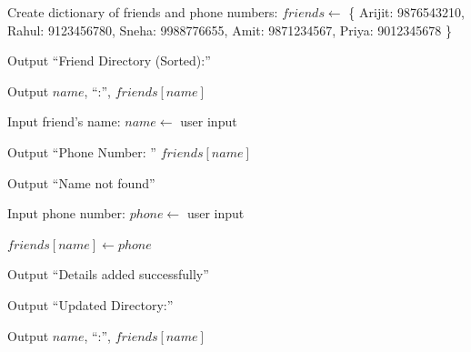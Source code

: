 \begin{algorithm}
\caption{Search and Update a Friend Directory}
\begin{algorithmic}[1]

\STATE Create dictionary of friends and phone numbers:
\STATE $friends \gets$
\{
Arijit: 9876543210,
Rahul: 9123456780,
Sneha: 9988776655,
Amit: 9871234567,
Priya: 9012345678
\}

\STATE Output ``Friend Directory (Sorted):''

    \STATE Output $name$, ``:'', $friends[name]$
\ENDFOR

\STATE Input friend's name:
\STATE $name \gets$ user input


    \STATE Output ``Phone Number: '' $friends[name]$

\ELSE

    \STATE Output ``Name not found''

    \STATE Input phone number:
    \STATE $phone \gets$ user input

    \STATE $friends[name] \gets phone$

    \STATE Output ``Details added successfully''

    \STATE Output ``Updated Directory:''

        \STATE Output $name$, ``:'', $friends[name]$
    \ENDFOR

\ENDIF

\end{algorithmic}
\end{algorithm}